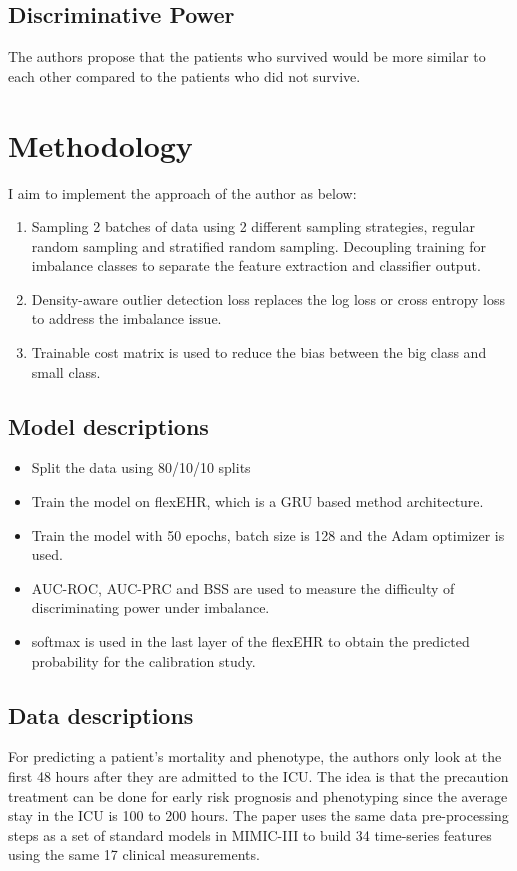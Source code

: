 \documentclass[11pt,a4paper]{article}
\begin{document}
\subsection{Discriminative Power}
The authors propose that  the patients who survived would be more similar to each other compared to the patients who did not survive. 

\section{Methodology}

I aim to implement the approach of the author as below:

\begin{enumerate}
    \item Sampling 2 batches of data using 2 different sampling strategies, regular random sampling and stratified random sampling. Decoupling training for imbalance classes to separate the feature extraction and classifier output. 
    \item Density-aware outlier detection loss replaces the log loss or cross entropy loss to address the imbalance issue. 
    \item Trainable cost matrix is used to reduce the bias between the big class and small class.  
\end{enumerate}
\subsection{Model descriptions}
\begin{itemize}
    \item Split the data using 80/10/10 splits
    \item Train the model on flexEHR, which is a GRU based method architecture.
    \item Train the model with 50 epochs, batch size is 128 and the Adam optimizer is used.
    \item AUC-ROC, AUC-PRC and BSS are used to measure the difficulty of discriminating power under imbalance.
    \item softmax is used in the last layer of the flexEHR to obtain the predicted probability for the calibration study.  
\end{itemize}



 

\subsection{Data descriptions}
For predicting a patient's mortality and phenotype, the authors only look at the first 48 hours after they are admitted to the ICU. The idea is that the precaution treatment can be done for early risk prognosis and phenotyping since the average stay in the ICU is 100 to 200 hours. The paper uses the same data pre-processing steps as a set of standard models in MIMIC-III \cite{dataprocessing} to build 34 time-series features using the same 17 clinical measurements. 
\end{document}
